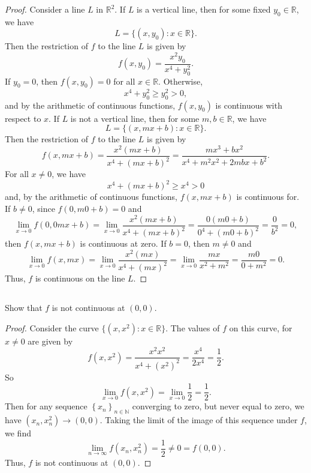 \documentclass[12pt]{article}
\newenvironment{problem}
    {\begin{lrbox}{\mybox}\begin{minipage}{0.98\textwidth}}
    {\end{minipage}\end{lrbox}\framebox[\textwidth]{\usebox{\mybox}}}
\newcommand{\N}{\mathbb{N}}
\newcommand{\R}{\mathbb{R}}
\newcommand{\seq}[2][n]{\left\{#2\right\}_{#1\in\N}}
\begin{document}
\begin{proof}
    Consider a line $L$ in $\R^2$. If $L$ is a vertical line, then for some fixed $y_0 \in \R$, we have
    \[
        L = \{(x, y_0) : x \in \R\}.
    \]
    Then the restriction of $f$ to the line $L$ is given by
    \[
        f(x, y_0) = \frac{x^2y_0}{x^4 + y_0^2}.
    \]
    If $y_0 = 0$, then $f(x,y_0) = 0$ for all $x \in \R$. Otherwise,
    \[
        x^4 + y_0^2 \geq y_0^2 > 0,
    \]
    and by the arithmetic of continuous functions, $f(x, y_0)$ is continuous with respect to $x$. If $L$ is not a vertical line, then for some $m, b \in \R$, we have
    \[
        L = \{(x, mx + b) : x \in \R\}.
    \]
    Then the restriction of $f$ to the line $L$ is given by
    \[
        f(x, mx + b) = \frac{x^2(mx + b)}{x^4 + (mx + b)^2} = \frac{mx^3 + bx^2}{x^4 + m^2x^2 + 2mbx + b^2}.
    \]
    For all $x \ne 0$, we have
    \[
        x^4 + (mx + b)^2 \geq x^4 > 0
    \]
    and, by the arithmetic of continuous functions, $f(x, mx + b)$ is continuous for. If $b \ne 0$, since $f(0, m0 + b) = 0$ and
    \[
        \lim_{x \to 0} f(0, 0mx + b) = \lim_{x \to 0} \frac{x^2(mx + b)}{x^4 + (mx + b)^2} = \frac{0(m0 + b)}{0^4 + (m0 + b)^2} = \frac{0}{b^2} = 0,
    \]
    then $f(x, mx + b)$ is continuous at zero. If $b = 0$, then $m \ne 0$ and
    \[
        \lim_{x \to 0} f(x, mx) = \lim_{x \to 0} \frac{x^2(mx)}{x^4 + (mx)^2} = \lim_{x \to 0} \frac{mx}{x^2 + m^2} = \frac{m0}{0 + m^2} = 0.
    \]
    Thus, $f$ is continuous on the line $L$.
    
\end{proof}

\newpage
\subsection{}
\begin{problem}
    Show that $f$ is not continuous at $(0,0)$.
\end{problem}

\begin{proof}
    Consider the curve $\{(x, x^2) : x \in \R\}$. The values of $f$ on this curve, for $x \ne 0$ are given by
    \[
        f(x, x^2) = \frac{x^2x^2}{x^4 + (x^2)^2} = \frac{x^4}{2x^4} = \frac12.
    \]
    So
    \[
        \lim_{x \to 0} f(x, x^2) = \lim_{x \to 0} \frac12 = \frac12.
    \]
    Then for any sequence $\seq{x_n}$ converging to zero, but never equal to zero, we have $(x_n, x_n^2) \to (0, 0)$. Taking the limit of the image of this sequence under $f$, we find
    \[
        \lim_{n \to \infty} f(x_n, x_n^2) = \frac12 \ne 0 = f(0, 0).
    \]
    Thus, $f$ is not continuous at $(0, 0)$.
    
    
\end{proof}
\end{document}
